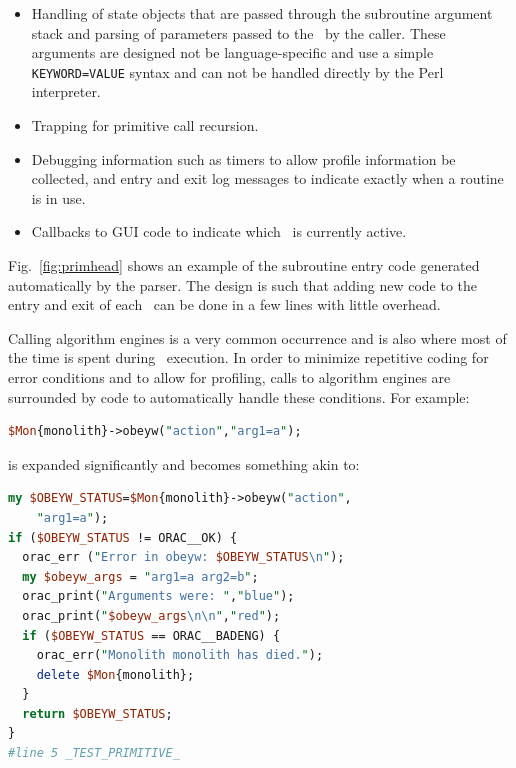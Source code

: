 \documentclass[final,authoryear,5p,times,twocolumn]{elsarticle}
\begin{document}
\begin{itemize}

\item Handling of state objects that are passed through the subroutine
  argument stack and parsing of parameters passed to the \primitive\
  by the caller. These arguments are designed not be language-specific
  and use a simple \texttt{KEYWORD=VALUE} syntax
  and can not be handled directly by the Perl interpreter.

\item Trapping for primitive call recursion.

\item Debugging information
such as timers to allow profile information be
collected, and entry and exit log messages to indicate exactly when
a routine is in use.

\item Callbacks to GUI code to indicate which \primitive\ is
currently active.

\end{itemize}

Fig.\ \ref{fig:primhead} shows an example of the subroutine entry code generated automatically by the
parser. The design is such that adding new code to the entry and exit of each
\primitive\ can be done in a few lines with little overhead.

Calling algorithm engines is a very common occurrence and is also where
most of the time is spent during \recipe\ execution. In order to
minimize repetitive coding for error conditions and to allow for profiling, calls to
algorithm engines are surrounded by code to automatically handle these
conditions. For example:

\begin{lstlisting}[language=perl]
$Mon{monolith}->obeyw("action","arg1=a");
\end{lstlisting}

is expanded significantly and becomes something akin to:

\begin{lstlisting}[language=perl]
my $OBEYW_STATUS=$Mon{monolith}->obeyw("action",
    "arg1=a");
if ($OBEYW_STATUS != ORAC__OK) {
  orac_err ("Error in obeyw: $OBEYW_STATUS\n");
  my $obeyw_args = "arg1=a arg2=b";
  orac_print("Arguments were: ","blue");
  orac_print("$obeyw_args\n\n","red");
  if ($OBEYW_STATUS == ORAC__BADENG) {
    orac_err("Monolith monolith has died.");
    delete $Mon{monolith};
  }
  return $OBEYW_STATUS;
}
#line 5 _TEST_PRIMITIVE_
\end{lstlisting}
\end{document}
